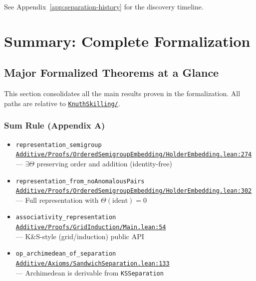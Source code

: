 \documentclass[11pt]{article}
\theoremstyle{definition}
\theoremstyle{remark}
\begin{document}
See Appendix~\ref{app:separation-history} for the discovery timeline.

\newpage
\section{Summary: Complete Formalization}

\subsection{Major Formalized Theorems at a Glance}

This section consolidates all the main results proven in the formalization.
All paths are relative to \href{https://github.com/zariuq/ks-foundations-of-inference/tree/main/KnuthSkilling/}{\texttt{KnuthSkilling/}}.

\subsubsection*{Sum Rule (Appendix A)}
\begin{itemize}
\item \texttt{representation\_semigroup}\\
      \href{https://github.com/zariuq/ks-foundations-of-inference/blob/main/KnuthSkilling/Additive/Proofs/OrderedSemigroupEmbedding/HolderEmbedding.lean\#L274}{\texttt{Additive/Proofs/OrderedSemigroupEmbedding/HolderEmbedding.lean:274}}\\
      --- $\exists \Theta$ preserving order and addition (identity-free)
\item \texttt{representation\_from\_noAnomalousPairs}\\
      \href{https://github.com/zariuq/ks-foundations-of-inference/blob/main/KnuthSkilling/Additive/Proofs/OrderedSemigroupEmbedding/HolderEmbedding.lean\#L302}{\texttt{Additive/Proofs/OrderedSemigroupEmbedding/HolderEmbedding.lean:302}}\\
      --- Full representation with $\Theta(\text{ident}) = 0$
\item \texttt{associativity\_representation}\\
      \href{https://github.com/zariuq/ks-foundations-of-inference/blob/main/KnuthSkilling/Additive/Proofs/GridInduction/Main.lean\#L54}{\texttt{Additive/Proofs/GridInduction/Main.lean:54}}\\
      --- K\&S-style (grid/induction) public API
\item \texttt{op\_archimedean\_of\_separation}\\
      \href{https://github.com/zariuq/ks-foundations-of-inference/blob/main/KnuthSkilling/Additive/Axioms/SandwichSeparation.lean\#L133}{\texttt{Additive/Axioms/SandwichSeparation.lean:133}}\\
      --- Archimedean is derivable from \texttt{KSSeparation}
\end{itemize}
\end{document}
